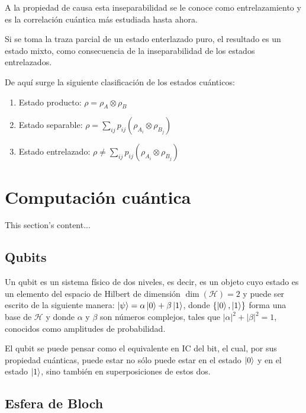 A la propiedad de causa esta inseparabilidad se le conoce como entrelazamiento y es la correlación cuántica más estudiada hasta ahora.

Si se toma la traza parcial de un estado enterlazado puro, el resultado es un estado mixto, como consecuencia de la inseparabilidad de los estados entrelazados.

De aquí surge la siguiente clasificación de los estados cuánticos:

\begin{enumerate}
    \item Estado producto: $\rho = \rho_A \otimes \rho_B$
    \item Estado separable: $\rho = \sum\limits_{i j} p_{i j} (\rho_{A_i} \otimes \rho_{B_j})$
    \item Estado entrelazado: $\rho \neq \sum\limits_{i j} p_{i j} (\rho_{A_i} \otimes \rho_{B_j})$
\end{enumerate}


\section{Computación cuántica}
This section's content...

\subsection{Qubits}
Un qubit es un sistema físico de dos niveles, es decir, es un objeto cuyo estado es un elemento del espacio de Hilbert de dimensión $\dim (\mathcal{H})=2$ y puede ser escrito de la siguiente manera: $ \ket{\psi} = \alpha \ket{0} + \beta \ket{1} $, donde $ \{ \ket{0},\ket{1} \} $ forma una base de $\mathcal{H}$ y donde $ \alpha $ y $ \beta $ son números complejos, tales que $ | \alpha |^2 + | \beta |^2 = 1 $, conocidos como amplitudes de probabilidad.
\vspace{0.5cm}

El qubit se puede pensar como el equivalente en IC del bit, el cual, por sus propiedad cuánticas, puede estar no sólo puede estar en el estado $\ket{0}$ y en el estado $\ket{1}$, sino también en superposiciones de estos dos.
\vspace{0.5cm}

\subsection{Esfera de Bloch}

